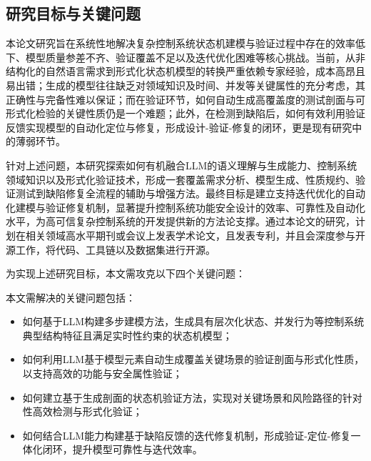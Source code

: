 \subsection{研究目标与关键问题}
\label{section-bg-target}


本论文研究旨在系统性地解决复杂控制系统状态机建模与验证过程中存在的效率低下、模型质量参差不齐、验证覆盖不足以及迭代优化困难等核心挑战。当前，从非结构化的自然语言需求到形式化状态机模型的转换严重依赖专家经验，成本高昂且易出错；生成的模型往往缺乏对领域知识及时间、并发等关键属性的充分考虑，其正确性与完备性难以保证；而在验证环节，如何自动生成高覆盖度的测试剖面与可形式化检验的关键性质仍是一个难题；此外，在检测到缺陷后，如何有效利用验证反馈实现模型的自动化定位与修复，形成设计-验证-修复的闭环，更是现有研究中的薄弱环节。

针对上述问题，本研究探索如何有机融合LLM的语义理解与生成能力、控制系统领域知识以及形式化验证技术，形成一套覆盖需求分析、模型生成、性质规约、验证测试到缺陷修复全流程的辅助与增强方法。最终目标是建立支持迭代优化的自动化建模与验证修复机制，显著提升控制系统功能安全设计的效率、可靠性及自动化水平，为高可信复杂控制系统的开发提供新的方法论支撑。通过本论文的研究，计划在相关领域高水平期刊或会议上发表学术论文，且发表专利，并且会深度参与开源工作，将代码、工具链以及数据集进行开源。

为实现上述研究目标，本文需攻克以下四个关键问题：

本文需解决的关键问题包括：
\begin{itemize}
    \item 如何基于LLM构建多步建模方法，生成具有层次化状态、并发行为等控制系统典型结构特征且满足实时性约束的状态机模型；
    \item 如何利用LLM基于模型元素自动生成覆盖关键场景的验证剖面与形式化性质，以支持高效的功能与安全属性验证；
    \item 如何建立基于生成剖面的状态机验证方法，实现对关键场景和风险路径的针对性高效检测与形式化验证；
    \item 如何结合LLM能力构建基于缺陷反馈的迭代修复机制，形成验证-定位-修复一体化闭环，提升模型可靠性与迭代效率。
\end{itemize}

